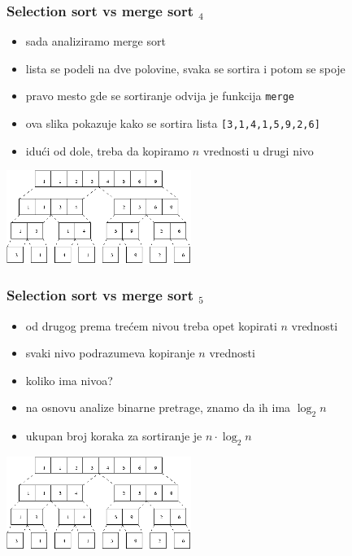 \documentclass[utf8,compress]{beamer}
\begin{document}
\begin{frame}[fragile]
  \frametitle{Selection sort vs merge sort $_4$}
  \begin{itemize}
    \item sada analiziramo merge sort
    \item lista se podeli na dve polovine, svaka se sortira i potom se spoje
    \item pravo mesto gde se sortiranje odvija je funkcija \texttt{merge}
    \item ova slika pokazuje kako se sortira lista \texttt{[3,1,4,1,5,9,2,6]}
    \item idući od dole, treba da kopiramo $n$ vrednosti u drugi nivo
  \end{itemize}
\begin{center}
  \includegraphics[width=6cm]{pic28}
\end{center}
\end{frame}

\begin{frame}[fragile]
  \frametitle{Selection sort vs merge sort $_5$}
  \begin{itemize}
    \item od drugog prema trećem nivou treba opet kopirati $n$ vrednosti
    \item svaki nivo podrazumeva kopiranje $n$ vrednosti
    \item koliko ima nivoa?
    \item na osnovu analize binarne pretrage, znamo da ih ima $\log_2 n$
    \item ukupan broj koraka za sortiranje je $n\cdot\log_2 n$
  \end{itemize}
\begin{center}
  \includegraphics[width=6cm]{pic28}
\end{center}
\end{frame}
\end{document}
